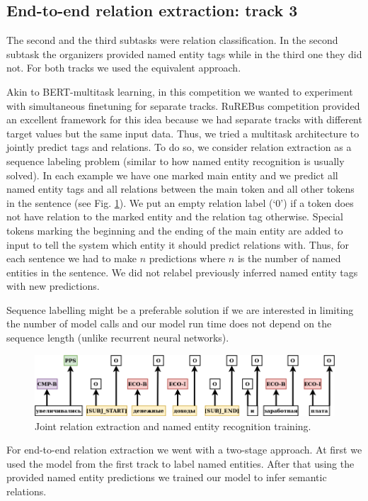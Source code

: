 \documentclass{dialogue}
\begin{document}
	\subsection{End-to-end relation extraction: track 3}
	The second and the third subtasks were relation classification. In the second subtask the organizers provided named entity tags while in the third one they did not. For both tracks we used the equivalent approach.
	
	Akin to BERT-multitask learning, in this competition we wanted to experiment with simultaneous finetuning for separate tracks. RuREBus competition provided an excellent framework for this idea because we had separate tracks with different target values but the same input data. Thus, we tried a multitask architecture to jointly predict tags and relations. To do so, we consider relation extraction as a sequence labeling problem (similar to how named entity recognition is usually solved). In each example we have one marked main entity and we predict all named entity tags and all relations between the main token and all other tokens in the sentence (see Fig. \ref{fig:rel}). We put an empty relation label (‘0’) if a token does not have relation to the marked entity and the relation tag otherwise. Special tokens marking the beginning and the ending of the main entity are added to input to tell the system which entity it should predict relations with. Thus, for each sentence we had to make $n$ predictions where $n$ is the number of named entities in the sentence. We did not relabel previously inferred named entity tags with new predictions.
	
	Sequence labelling might be a preferable solution if we are interested in limiting the number of model calls and our model run time does not depend on the sequence length (unlike recurrent neural networks).
	
	\begin{figure}[thb]
		\centering
		\includegraphics[scale=0.5]{pics/rel2}
		\caption{Joint relation extraction and named entity recognition training.}
		\label{fig:rel}
	\end{figure}
	
	
	For end-to-end relation extraction we went with a two-stage approach. At first we used the model from the first track to label named entities. After that using the provided named entity predictions we trained our model to infer semantic relations.
	
\end{document}
